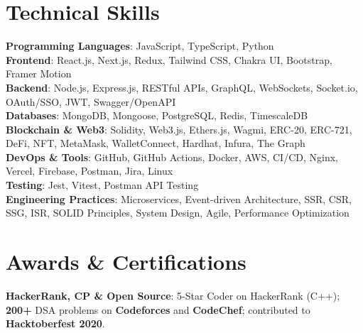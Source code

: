 \section{Technical Skills}
    \begin{itemize}[leftmargin=0.15in, label={}]
    \small{\item{
        \textbf{Programming Languages}{: JavaScript, TypeScript, Python} \\
        \textbf{Frontend}{: React.js, Next.js, Redux, Tailwind CSS, Chakra UI, Bootstrap, Framer Motion} \\
        \textbf{Backend}{: Node.js, Express.js, RESTful APIs, GraphQL, WebSockets, Socket.io, OAuth/SSO, JWT, Swagger/OpenAPI} \\
        \textbf{Databases}{: MongoDB, Mongoose, PostgreSQL, Redis, TimescaleDB} \\
        \textbf{Blockchain \& Web3}{: Solidity, Web3.js, Ethers.js, Wagmi, ERC-20, ERC-721, DeFi, NFT, MetaMask, WalletConnect, Hardhat, Infura, The Graph} \\
        \textbf{DevOps \& Tools}{: GitHub, GitHub Actions, Docker, AWS, CI/CD, Nginx, Vercel, Firebase, Postman, Jira, Linux} \\
        \textbf{Testing}{: Jest, Vitest, Postman API Testing} \\
        \textbf{Engineering Practices}{: Microservices, Event-driven Architecture, SSR, CSR, SSG, ISR, SOLID Principles, System Design, Agile, Performance Optimization}
    }}
    \end{itemize}

\section{Awards \& Certifications}
    \begin{itemize}[leftmargin=0.15in, label={}]
    \small{\item{
        \textbf{HackerRank, CP \& Open Source}{: 5-Star Coder on HackerRank (C++); \textbf{200+} DSA problems on \textbf{Codeforces} and \textbf{CodeChef}; contributed to \textbf{Hacktoberfest 2020}.}
    }}
    \end{itemize}